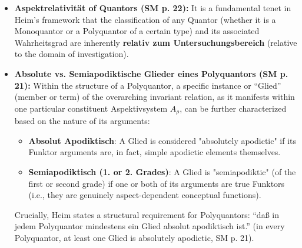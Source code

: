 \documentclass[12pt]{article}
\newcommand{\q}[1]{\enquote{#1}}
\begin{document}
\begin{itemize}
\begin{enumerate}
\begin{equation}
        (\ )_\rho, \left. {}^{\mathrm{f}_\rho}_{|} \overline{|\mathrm{A}_\rho|} \right.^{\mathrm{r}}_\gamma, (\ )_\rho \lor \beta_\rho \equiv \mathrm{f}_\rho; \alpha_\rho \lor \alpha_\rho \equiv \mathrm{A}_\rho \lor \beta_\rho \equiv \mathrm{B}_\rho
        \label{eq:polyquantor_continuous_full}
        \tag{4}
        \end{equation}
        Its Wahrheitsgrad, in this case, is related to the \q{measure} or extent of the continuous manifold \( B_\rho \) over which it holds (SM p. 22). This mathematical leap into the continuum is Heim's rigorous foundation for treating subjective perspectives as a continuous field, an absolutely vital step before progressing into physics.
    \end{enumerate}

    \item \textbf{Aspektrelativität of Quantors (SM p. 22):}
    It is a fundamental tenet in Heim's framework that the classification of any Quantor (whether it is a Monoquantor or a Polyquantor of a certain type) and its associated Wahrheitsgrad are inherently \textbf{relativ zum Untersuchungsbereich} (relative to the domain of investigation). 

    \item \textbf{Absolute vs. Semiapodiktische Glieder eines Polyquantors (SM p. 21):}
    Within the structure of a Polyquantor, a specific instance or \q{Glied} (member or term) of the overarching invariant relation, as it manifests within one particular constituent Aspektivsystem \( A_\rho \), can be further characterized based on the nature of its arguments:
    \begin{itemize}
        \item \textbf{Absolut Apodiktisch}: A Glied is considered "absolutely apodictic" if its Funktor arguments are, in fact, simple apodictic elements themselves.
        \item \textbf{Semiapodiktisch (1. or 2. Grades)}: A Glied is "semiapodiktic" (of the first or second grade) if one or both of its arguments are true Funktors (i.e., they are genuinely aspect-dependent conceptual functions).
    \end{itemize}
    Crucially, Heim states a structural requirement for Polyquantors: \q{daß in jedem Polyquantor mindestens ein Glied absolut apodiktisch ist.} (in every Polyquantor, at least one Glied is absolutely apodictic, SM p. 21).


\end{itemize}
\end{document}
